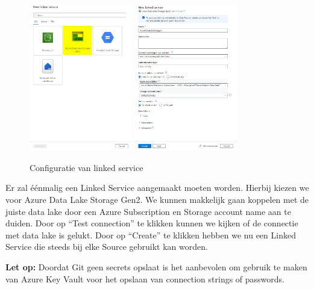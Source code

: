 \begin{figure}[H]
    \centering
    \includegraphics[width=0.4\textwidth]{./graphics/adf/source_table_2_specific}
    \hspace{0.1\textwidth}
    \includegraphics[width=0.4\textwidth]{./graphics/adf/source_table_3_specific}
    \caption{Configuratie van linked service}
\end{figure}

Er zal éénmalig een Linked Service aangemaakt moeten worden. Hierbij kiezen we voor Azure Data Lake Storage Gen2. We kunnen makkelijk gaan koppelen met de juiste data lake door een Azure Subscription en Storage account name aan te duiden. Door op ``Test connection'' te klikken kunnen we kijken of de connectie met data lake is gelukt. Door op ``Create'' te klikken hebben we nu een Linked Service die steeds bij elke Source gebruikt kan worden.

\textbf{Let op:} Doordat Git geen secrets opslaat is het aanbevolen om gebruik te maken van Azure Key Vault voor het opslaan van connection strings of passwords.

